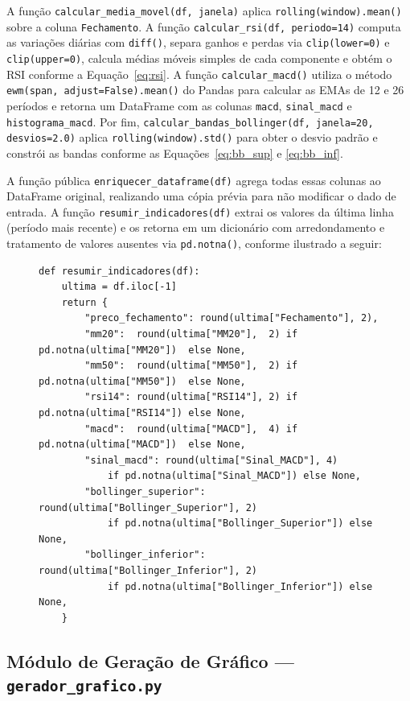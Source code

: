 \documentclass[conference]{IEEEtran}
\begin{document}
A função \texttt{calcular\_media\_movel(df, janela)} aplica \texttt{rolling(window).mean()} sobre a coluna \texttt{Fechamento}. A função \texttt{calcular\_rsi(df, periodo=14)} computa as variações diárias com \texttt{diff()}, separa ganhos e perdas via \texttt{clip(lower=0)} e \texttt{clip(upper=0)}, calcula médias móveis simples de cada componente e obtém o RSI conforme a Equação~\ref{eq:rsi}. A função \texttt{calcular\_macd()} utiliza o método \texttt{ewm(span, adjust=False).mean()} do Pandas para calcular as EMAs de 12 e 26 períodos e retorna um DataFrame com as colunas \texttt{macd}, \texttt{sinal\_macd} e \texttt{histograma\_macd}. Por fim, \texttt{calcular\_bandas\_bollinger(df, janela=20, desvios=2.0)} aplica \texttt{rolling(window).std()} para obter o desvio padrão e constrói as bandas conforme as Equações~\ref{eq:bb_sup} e \ref{eq:bb_inf}.

A função pública \texttt{enriquecer\_dataframe(df)} agrega todas essas colunas ao DataFrame original, realizando uma cópia prévia para não modificar o dado de entrada. A função \texttt{resumir\_indicadores(df)} extrai os valores da última linha (período mais recente) e os retorna em um dicionário com arredondamento e tratamento de valores ausentes via \texttt{pd.notna()}, conforme ilustrado a seguir:

\begin{figure}[H]
\begin{lstlisting}[caption={Resumo dos indicadores da última vela.}]
def resumir_indicadores(df):
    ultima = df.iloc[-1]
    return {
        "preco_fechamento": round(ultima["Fechamento"], 2),
        "mm20":  round(ultima["MM20"],  2) if pd.notna(ultima["MM20"])  else None,
        "mm50":  round(ultima["MM50"],  2) if pd.notna(ultima["MM50"])  else None,
        "rsi14": round(ultima["RSI14"], 2) if pd.notna(ultima["RSI14"]) else None,
        "macd":  round(ultima["MACD"],  4) if pd.notna(ultima["MACD"])  else None,
        "sinal_macd": round(ultima["Sinal_MACD"], 4)
            if pd.notna(ultima["Sinal_MACD"]) else None,
        "bollinger_superior": round(ultima["Bollinger_Superior"], 2)
            if pd.notna(ultima["Bollinger_Superior"]) else None,
        "bollinger_inferior": round(ultima["Bollinger_Inferior"], 2)
            if pd.notna(ultima["Bollinger_Inferior"]) else None,
    }
\end{lstlisting}
\end{figure}

\subsection{Módulo de Geração de Gráfico — \texttt{gerador\_grafico.py}}
\end{document}
